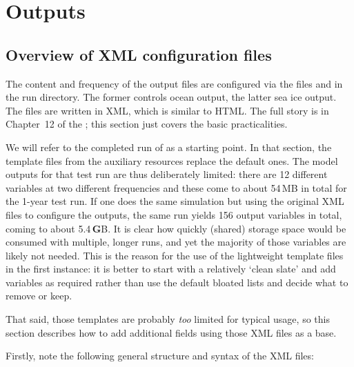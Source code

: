 \clearpage
\section{Outputs}
\label{sec:outputs}

\subsection{Overview of XML configuration files}

The content and frequency of the \NEMOSIcu{} output files are configured via the files  and  in the run directory.
The former controls ocean output, the latter sea ice output.
The files are written in XML, which is similar to HTML.
The full story is in Chapter~12 of the ; this section just covers the basic practicalities.

We will refer to the completed run of  as a starting point.
In that section, the template  files from the auxiliary resources replace the default ones.
The model outputs for that test run are thus deliberately limited: there are 12 different variables at two different frequencies and these come to about 54\,MB in total for the 1-year test run.
If one does the same simulation but using the original XML files to configure the outputs, the same run yields 156 output variables in total, coming to about 5.4\,\textbf{G}B.
It is clear how quickly (shared) storage space would be consumed with multiple, longer runs, and yet the majority of those variables are likely not needed.
This is the reason for the use of the lightweight template files in the first instance: it is better to start with a relatively `clean slate' and add variables as required rather than use the default bloated lists and decide what to remove or keep.

That said, those templates are probably \textit{too} limited for typical usage, so this section describes how to add additional fields using those XML files as a base.

Firstly, note the following general structure and syntax of the XML files:

\begin{VerbatimXML}[samepage=true]
\end{VerbatimXML}

